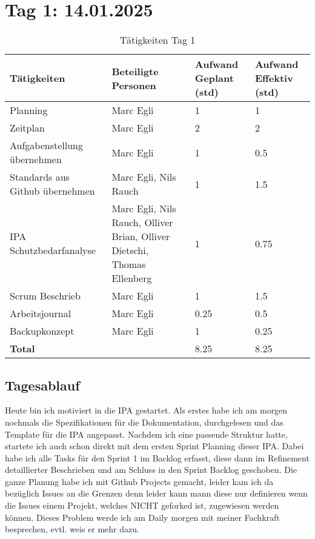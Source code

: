 \section{Tag 1: 14.01.2025}
\begin{table}[H]
    \begin{tabular}{|L{0.4\textwidth}|C{60pt}|C{60pt}|C{60pt}|}
        \hline
        \color{white}Tätigkeiten & \color{white}Beteiligte \color{white}Personen & \color{white}Aufwand Geplant (std) & \color{white}Aufwand Effektiv (std) \\
        \hline
        Planning & Marc Egli & 1 & 1 \\
        \hline
        Zeitplan & Marc Egli & 2 & 2 \\
        \hline
        Aufgabenstellung übernehmen & Marc Egli & 1 & 0.5 \\
        \hline
        Standards aus Github übernehmen & Marc Egli, Nils Rauch & 1 & 1.5 \\
        \hline
        IPA Schutzbedarfanalyse & Marc Egli, Nils Rauch, Olliver Brian, Olliver Dietschi, Thomas Ellenberg & 1 & 0.75 \\
        \hline
        Scrum Beschrieb & Marc Egli & 1 & 1.5 \\
        \hline
        Arbeitsjournal & Marc Egli & 0.25 & 0.5 \\
        \hline
        Backupkonzept & Marc Egli & 1 & 0.25 \\
        \hline
        \textbf{Total} &  & 8.25 & 8.25 \\
        \hline
    \end{tabular}
    \caption{Tätigkeiten Tag 1}
\end{table}

\subsection*{Tagesablauf}
Heute bin ich motiviert in die IPA gestartet. Als erstes habe ich am morgen nochmals die Spezifikationen für
die Dokumentation, durchgelesen und das Template für die IPA angepasst. Nachdem ich eine passende Struktur hatte, 
startete ich auch schon direkt mit dem ersten Sprint Planning dieser IPA. Dabei habe ich alle Tasks für den Sprint 1
im Backlog erfasst, diese dann im Refinement detaillierter Beschrieben und am Schluss in den Sprint Backlog geschoben.
Die ganze Planung habe ich mit Github Projects gemacht, leider kam ich da bezüglich Issues an die Grenzen denn leider kann mann 
diese nur definieren wenn die Issues einem Projekt, welches NICHT geforked ist, zugewiesen werden können. Dieses Problem werde
ich am Daily morgen mit meiner Fachkraft besprechen, evtl. weis er mehr dazu. 

